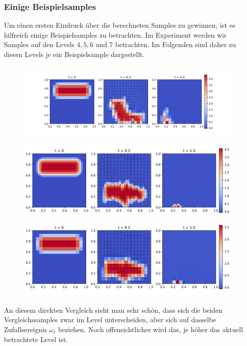 \subsubsection{Einige Beispielsamples}
Um einen ersten Eindruck über die berechneten Samples zu gewinnen, ist es hilfreich einige Beispielsamples zu betrachten. Im Experiment werden wir Samples auf den Levels $ 4,5,6 $ und $ 7 $ betrachten. Im Folgenden sind daher zu diesen Levels je ein Beispielsample dargestellt.
\begin{figure}[H]
	\centering
	\includegraphics[width=\textwidth]{plots/sample_4_1.png} 
\end{figure}
\begin{figure}[H]
	\centering
	\includegraphics[width=\textwidth]{plots/sample_5_1.png} 
	\includegraphics[width=\textwidth]{plots/sample_coarse_5_1.png} 
\end{figure}
An diesem direkten Vergleich sieht man sehr schön, dass sich die beiden Vergleichssamples zwar im Level unterscheiden, aber sich auf dasselbe Zufallsereignis $ \omega_i $ beziehen. Noch offensichtlicher wird das, je höher das aktuell betrachtete Level ist.
